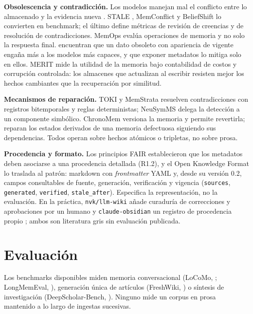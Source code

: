 \documentclass[11pt,letterpaper]{article}
\begin{document}
\textbf{Obsolescencia y contradicción.} Los modelos manejan mal el conflicto entre lo almacenado y la evidencia nueva \citep{xu2024conflicts,hase2024}. STALE \citep{chao2026}, MemConflict \citep{tao2026} y BeliefShift \citep{myakala2026} lo convierten en benchmark; el último define métricas de revisión de creencias y de resolución de contradicciones. MemOps \citep{hao2026} evalúa operaciones de memoria y no solo la respuesta final. \citet{hu2026trust} encuentran que un dato obsoleto con apariencia de vigente engaña más a los modelos más capaces, y que exponer metadatos lo mitiga solo en ellos. MERIT \citep{mishra2026} mide la utilidad de la memoria bajo contabilidad de costos y corrupción controlada: los almacenes que actualizan al escribir resisten mejor los hechos cambiantes que la recuperación por similitud.

\textbf{Mecanismos de reparación.} TOKI \citep{wang2026toki} y MemStrata \citep{yadav2026} resuelven contradicciones con registros bitemporales y reglas deterministas; NeuSymMS \citep{sultan2026} delega la detección a un componente simbólico. ChronoMem \citep{su2026} versiona la memoria y permite revertirla; \citet{yu2026} reparan los estados derivados de una memoria defectuosa siguiendo sus dependencias. Todos operan sobre hechos atómicos o tripletas, no sobre prosa.

\textbf{Procedencia y formato.} Los principios FAIR \citep{wilkinson2016} establecieron que los metadatos deben asociarse a una procedencia detallada (R1.2), y el Open Knowledge Format \citep{okf2026} lo traslada al patrón: markdown con \emph{frontmatter} YAML y, desde su versión 0.2, campos consultables de fuente, generación, verificación y vigencia (\texttt{sources}, \texttt{generated}, \texttt{verified}, \texttt{stale\_after}). Especifica la representación, no la evaluación. En la práctica, \texttt{nvk/llm-wiki} añade curaduría de correcciones y aprobaciones por un humano \citep{nvk2026} y \texttt{claude-obsidian} un registro de procedencia propio \citep{agrici2026}; ambos son literatura gris sin evaluación publicada.

\section{Evaluación}

Los benchmarks disponibles miden memoria conversacional (LoCoMo, \citealp{maharana2024}; LongMemEval, \citealp{wu2024}), generación única de artículos (FreshWiki, \citealp{shao2024}) o síntesis de investigación (DeepScholar-Bench, \citealp{patel2025}). Ninguno mide un corpus en prosa mantenido a lo largo de ingestas sucesivas.
\end{document}
